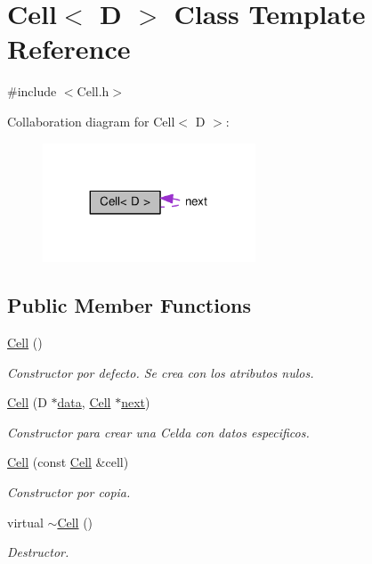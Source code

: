 \hypertarget{classCell}{}\section{Cell$<$ D $>$ Class Template Reference}
\label{classCell}


{\ttfamily \#include $<$Cell.\+h$>$}



Collaboration diagram for Cell$<$ D $>$\+:
\nopagebreak
\begin{figure}[H]
\begin{center}
\leavevmode
\includegraphics[width=179pt]{classCell__coll__graph}
\end{center}
\end{figure}
\subsection*{Public Member Functions}
\begin{DoxyCompactItemize}
\item 
\hyperlink{classCell_a742a2adf7fa420fa9cbe386a87b5c79b}{Cell} ()
\begin{DoxyCompactList}\small\item\em Constructor por defecto. Se crea con los atributos nulos. \end{DoxyCompactList}\item 
\hyperlink{classCell_a6724cd6a883d7c16f2f529ecfd0dbf68}{Cell} (D $\ast$\hyperlink{classCell_ab8cc4d3059ef84a652eabc05b6c28f49}{data}, \hyperlink{classCell}{Cell} $\ast$\hyperlink{classCell_a7e0e6c090f8aca70862c2dbc3257e3b9}{next})
\begin{DoxyCompactList}\small\item\em Constructor para crear una Celda con datos especificos. \end{DoxyCompactList}\item 
\hyperlink{classCell_a1882f51b9de9f6f52c5fb0530128bc92}{Cell} (const \hyperlink{classCell}{Cell} \&cell)
\begin{DoxyCompactList}\small\item\em Constructor por copia. \end{DoxyCompactList}\item 
virtual \hyperlink{classCell_a8a6091a249d6ff583049c35c85f4d778}{$\sim$\+Cell} ()
\begin{DoxyCompactList}\small\item\em Destructor. \end{DoxyCompactList}\end{DoxyCompactItemize}
